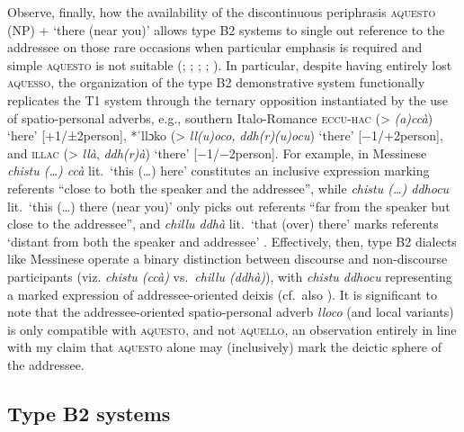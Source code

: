 \documentclass[output=paper]{langsci/langscibook}
\begin{document}
Observe, finally, how the availability of the discontinuous periphrasis
\textsc{aquesto} (NP) + ‘there (near you)’ allows type B2 systems to
single out reference to the addressee on those rare occasions when particular
emphasis is required and simple \textsc{aquesto} is not suitable
(\citealt[74]{Parascandola:1976a}; \citealt[258]{Vann:1995a};
\citealt[102f]{ledgeway2004sviluppo}; \citealt[211]{Ledgeway:2009a};
\citealt[§5]{Jungbluth:2017a}). In particular, despite having
entirely lost \textsc{aquesso}, the organization of the type B2
demonstrative system functionally replicates the T1 system through the ternary
opposition instantiated by the use of spatio-personal adverbs, e.g., southern
Italo-Romance \textsc{eccu-hac} (> \emph{(a)ccà}) ‘here’ [+1/±2person], *ˈllɔko
(> \emph{ll(u)oco,} \emph{ddh(r)(u)ocu}) ‘there’ [−1/+2person], and
\textsc{illac} (> \emph{llà}, \emph{ddh(r)à}) ‘there’
[−1/−2person]. For example, in Messinese \emph{chistu
(\dots{}) ccà} lit.\ ‘this (\dots{}) here’ constitutes an inclusive expression
marking referents \enquote{close to both the speaker and the addressee}, while
\emph{chistu (\dots{}) ddhocu} lit.\ ‘this (\dots{}) there (near you)’ only
picks out referents \enquote{far from the speaker but close to the addressee},
and \emph{chillu ddhà} lit.\ ‘that (over) there’ marks referents ‘distant from
both the speaker and addressee’ \citep[30]{Quartarone:1998a}. Effectively,
then, type B2 dialects like Messinese operate a binary distinction
between discourse and non-discourse participants (viz. \emph{chistu (ccà)} vs.\
\emph{chillu (ddhà)}), with \emph{chistu ddhocu} representing a marked
expression of ad\-dress\-ee-ori\-ent\-ed \is{deixis}deix\-is (cf.\
also \citealt[76f]{Stavinschi:2009a}). It is significant to note that the
addressee-ori\-ent\-ed spatio-personal adverb \emph{lloco} (and local variants) is
only compatible with \textsc{aquesto}, and not \textsc{aquello}, an observation
entirely in line with my claim that \textsc{aquesto} alone may (inclusively)
mark the deictic sphere of the addressee.

\subsection{Type B2 systems}\label{sub:4.2}
\end{document}
